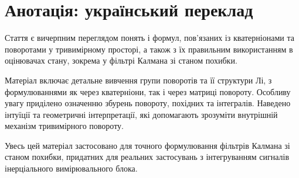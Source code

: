 \section{Анотація: український переклад}

Стаття є вичерпним переглядом понять і формул, пов'язаних із кватерніонами та поворотами у тривимірному просторі, а також з їх правильним використанням в оцінювачах стану, зокрема у фільтрі Калмана зі станом похибки.

Матеріал включає детальне вивчення групи поворотів та її структури Лі, з формулюваннями як через кватерніони, так і через матриці повороту. Особливу увагу приділено означенню збурень повороту, похідних та інтегралів. Наведено інтуїції та геометричні інтерпретації, які допомагають зрозуміти внутрішній механізм тривимірного повороту.

Увесь цей матеріал застосовано для точного формулювання фільтрів Калмана зі станом похибки, придатних для реальних застосувань з інтегруванням сигналів інерціального вимірювального блока.
